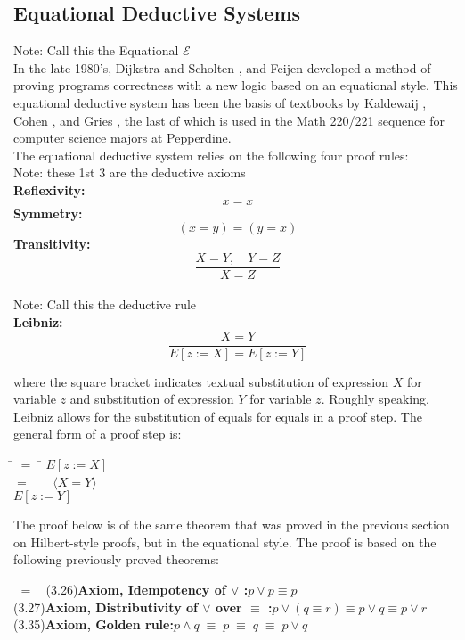 \documentclass[fleqn, leqno]{article}
\newcommand{\lgap}{2pt}                             %
\newcommand{\mymathindent}{24pt}                      %
\newcommand{\equivs}{\ensuremath{\;\equiv\;}}       %
\newcommand{\Gll} {\langle}                         %
\newcommand{\Ggg} {\rangle}                         %
\newcommand{\Hint}[1]     {\ \ \ $\Gll              \mbox{#1} \Ggg$ }   %
\begin{document}
\subsection{Equational Deductive Systems}

Note: Call this the Equational $\mathcal{E}$\\[\lgap]
In the late 1980's, Dijkstra and Scholten \cite{DandS}, and Feijen \cite{Feij} developed a method of proving
programs correctness with a new logic based on an equational style.
This equational deductive system has been the basis of textbooks by Kaldewaij \cite{Kald}, Cohen \cite{Cohen}, and Gries \cite{LADM},
the last of which is used in the Math 220/221 sequence for computer science majors at Pepperdine.\\

The equational deductive system relies on the following four proof rules:\\[\lgap]

Note: these 1st 3 are the deductive axioms\\
\textbf{Reflexivity:}
\[
x=x
\]
\textbf{Symmetry:}
\[
(x=y) = (y=x)
\]
\textbf{Transitivity:}
\[
\frac{X=Y, \quad Y=Z}{X=Z}
\]
\hfill\\
Note: Call this the deductive rule\\ 
\textbf{Leibniz:}
\[
\frac{X=Y}{E[z:=X]=E[z:=Y]}
\]

where the square bracket indicates textual substitution of expression $X$ for variable $z$ and substitution
of expression $Y$ for variable $z$.
Roughly speaking, Leibniz allows for the substitution of equals for equals in a proof step.
The general form of a proof step is:

\begin{tabbing}
\hspace{\mymathindent} \= $= \;$ \=  \kill
  \> \>   $E[z:=X]$\\[\lgap]
  \> $=$  \>  \Hint{$X=Y$} \\[\lgap]
  \> \>   $E[z:=Y]$
\end{tabbing}

The proof below is of the same theorem that was proved in the previous section on Hilbert-style proofs, but in the equational style.  The proof is based on the following previously proved theorems:\\

\begin{tabbing}
\hspace{\mymathindent} \= $= \;$ \=  \kill
(3.26)\>\textbf{Axiom, Idempotency of $\lor$ :}\quad $p\lor p \equiv p$\\[\lgap]
(3.27)\>\textbf{Axiom, Distributivity of $\lor$ over $\equiv$ :}\quad $p\lor (q\equiv r)\equiv p\lor q\equiv p\lor r$\\[\lgap]
(3.35)\>\textbf{Axiom, Golden rule:}\quad $p\land q\equivs p\equivs q\equivs p\lor q$\\[\lgap]
\end{tabbing}
\end{document}

